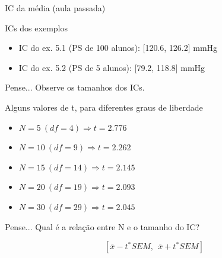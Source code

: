 \documentclass{beamer}
\begin{document}


\begin{frame}{IC da média (aula passada)}
  \begin{exampleblock}{ICs dos exemplos}
    \begin{itemize}
    \item IC do ex. 5.1 (PS de 100 alunos): [120.6, 126.2] mmHg
    \item IC do ex. 5.2 (PS de   5 alunos): [79.2, 118.8] mmHg
    \end{itemize}
  \end{exampleblock}
  \begin{block}{Pense...}
    Observe os tamanhos dos ICs.
  \end{block}
\end{frame}

\begin{frame}{Alguns valores de t, para diferentes graus de liberdade}
  \begin{itemize}
  \item $N = 5\ (df = 4) \Rightarrow t = 2.776$
  \item $N = 10\ (df = 9) \Rightarrow t = 2.262$
  \item $N = 15\ (df = 14) \Rightarrow t = 2.145$
  \item $N = 20\ (df = 19) \Rightarrow t = 2.093$
  \item $N = 30\ (df = 29) \Rightarrow t = 2.045$
  \end{itemize}
  \begin{block}{Pense...}
    Qual é a relação entre N e o tamanho do IC?

    \begin{displaymath}
      \left[ \bar{x} - t^{*} SEM,\ \ \bar{x} + t^{*} SEM \right]
    \end{displaymath}
  \end{block}
\end{frame}
\end{document}
